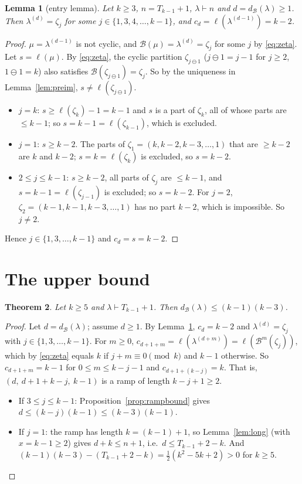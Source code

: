 \documentclass[11pt]{article}
\newtheorem{theorem}{Theorem}[section]
\newtheorem{lemma}[theorem]{Lemma}
\theoremstyle{definition}
\newcommand{\B}{\mathcal{B}}
\newcommand{\dB}{d_{\mathcal{B}}}
\renewcommand{\le}{\leqslant}
\renewcommand{\ge}{\geqslant}
\begin{document}
\begin{lemma}[entry lemma]\label{lem:entry}
Let $k\ge3$, $n=T_{k-1}+1$, $\lambda\vdash n$ and $d=\dB(\lambda)\ge1$.  Then $\lambda^{(d)}=\zeta_j$ for some
$j\in\{1,3,4,\dots,k-1\}$, and $c_d=\ell(\lambda^{(d-1)})=k-2$.
\end{lemma}
\begin{proof}
$\mu=\lambda^{(d-1)}$ is not cyclic, and $\B(\mu)=\lambda^{(d)}=\zeta_j$ for some $j$ by \eqref{eq:zeta}.  Let $s=\ell(\mu)$.
By \eqref{eq:zeta}, the cyclic partition $\zeta_{j\ominus1}$ ($j\ominus1=j-1$ for $j\ge2$, $1\ominus1=k$) also
satisfies $\B(\zeta_{j\ominus1})=\zeta_j$.  So by the uniqueness in Lemma~\ref{lem:preim},
$s\ne\ell(\zeta_{j\ominus1})$.
\begin{itemize}
\item $j=k$: $s\ge\ell(\zeta_k)-1=k-1$ and $s$ is a part of $\zeta_k$, all of whose parts are $\le k-1$; so
$s=k-1=\ell(\zeta_{k-1})$, which is excluded.
\item $j=1$: $s\ge k-2$.  The parts of $\zeta_1=(k,k-2,k-3,\dots,1)$ that are $\ge k-2$ are $k$ and $k-2$;
$s=k=\ell(\zeta_k)$ is excluded, so $s=k-2$.
\item $2\le j\le k-1$: $s\ge k-2$, all parts of $\zeta_j$ are $\le k-1$, and $s=k-1=\ell(\zeta_{j-1})$ is
excluded; so $s=k-2$.  For $j=2$, $\zeta_2=(k-1,k-1,k-3,\dots,1)$ has no part $k-2$, which is impossible.
So $j\ne2$.
\end{itemize}
Hence $j\in\{1,3,\dots,k-1\}$ and $c_d=s=k-2$.
\end{proof}

\section{The upper bound}\label{sec:c4upper}

\begin{theorem}\label{thm:c4upper}
Let $k\ge5$ and $\lambda\vdash T_{k-1}+1$.  Then $\dB(\lambda)\le(k-1)(k-3)$.
\end{theorem}
\begin{proof}
Let $d=\dB(\lambda)$; assume $d\ge1$.  By Lemma~\ref{lem:entry}, $c_d=k-2$ and $\lambda^{(d)}=\zeta_j$ with
$j\in\{1,3,\dots,k-1\}$.  For $m\ge0$, $c_{d+1+m}=\ell(\lambda^{(d+m)})=\ell(\B^m(\zeta_j))$, which by
\eqref{eq:zeta} equals $k$ if $j+m\equiv0\pmod k$ and $k-1$ otherwise.  So $c_{d+1+m}=k-1$ for
$0\le m\le k-j-1$ and $c_{d+1+(k-j)}=k$.  That is, $(d,\ d+1+k-j,\ k-1)$ is a ramp of length $k-j+1\ge2$.
\begin{itemize}
\item If $3\le j\le k-1$: Proposition~\ref{prop:rampbound} gives $d\le(k-j)(k-1)\le(k-3)(k-1)$.
\item If $j=1$: the ramp has length $k=(k-1)+1$, so Lemma~\ref{lem:long} (with $x=k-1\ge2$) gives
$d+k\le n+1$, i.e.\ $d\le T_{k-1}+2-k$.  And $(k-1)(k-3)-(T_{k-1}+2-k)=\tfrac12(k^2-5k+2)>0$ for $k\ge5$.
\end{itemize}
\end{proof}
\end{document}
